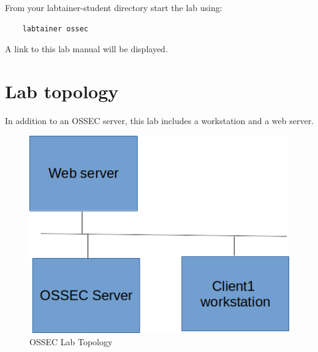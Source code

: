 From your labtainer-student directory start the lab using:
\begin{verbatim}
    labtainer ossec
\end{verbatim}
A link to this lab manual will be displayed.

\section{Lab topology}
In addition to an OSSEC server, this lab includes a workstation and a web server.

\begin{figure}[H]
\begin{center}
\includegraphics [width=0.8\linewidth]{ossec.png}
\end{center}
\caption{OSSEC Lab Topology}
\label{fig:topology}
\end{figure}

